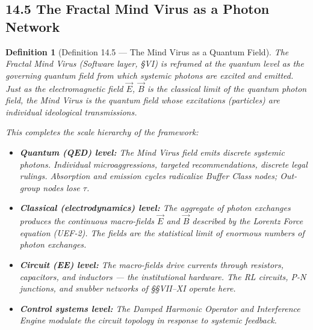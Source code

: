 \documentclass[12pt]{book}
\numberwithin{equation}{chapter}
\newtheorem{definition}{Definition}[chapter]
\begin{document}
\subsection{14.5 The Fractal Mind Virus as a Photon Network}

\begin{definition}[Definition 14.5 — The Mind Virus as a Quantum Field]
The Fractal Mind Virus (Software layer, §VI) is reframed at the quantum level as the \emph{governing quantum field} from which systemic photons are excited and emitted. Just as the electromagnetic field $\vec{E}$, $\vec{B}$ is the classical limit of the quantum photon field, the Mind Virus is the quantum field whose excitations (particles) are individual ideological transmissions.
    \
\

    This completes the scale hierarchy of the framework:
    
\begin{itemize}

\item \textbf{Quantum (QED) level:} The Mind Virus field emits discrete systemic photons. Individual microaggressions, targeted recommendations, discrete legal rulings. Absorption and emission cycles radicalize Buffer Class nodes; Out-group nodes lose $\tau$.

\item \textbf{Classical (electrodynamics) level:} The aggregate of photon exchanges produces the continuous macro-fields $\vec{E}$ and $\vec{B}$ described by the Lorentz Force equation (UEF-2). The fields are the statistical limit of enormous numbers of photon exchanges.

\item \textbf{Circuit (EE) level:} The macro-fields drive currents through resistors, capacitors, and inductors — the institutional hardware. The RL circuits, P-N junctions, and snubber networks of §§VII–XI operate here.

\item \textbf{Control systems level:} The Damped Harmonic Operator and Interference Engine modulate the circuit topology in response to systemic feedback.

\end{itemize}

\end{definition}
\end{document}

